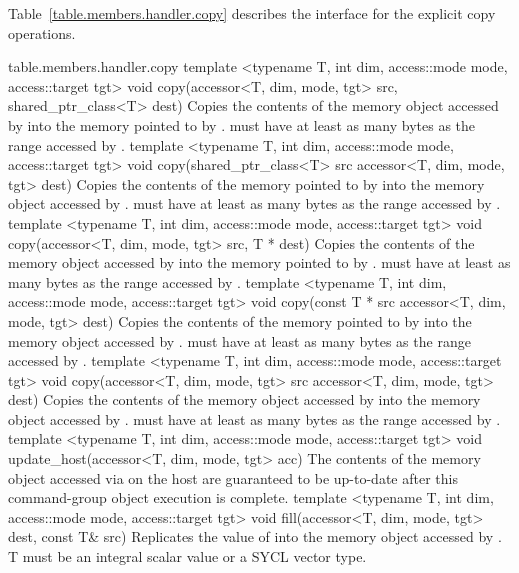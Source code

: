 Table~\ref{table.members.handler.copy} describes the interface for the
explicit copy operations.

{table.members.handler.copy}
  \addRowThreeL
    {template <typename T, int dim, access::mode mode, access::target tgt>}
    {void copy(accessor<T, dim, mode, tgt> src,}
    { shared_ptr_class<T> dest)}
    { Copies the contents of the memory object accessed by
       into the memory pointed to by .
       must have at least as many bytes as the
      range accessed by .}
  \addRowThreeL
    {template <typename T, int dim, access::mode mode, access::target tgt>}
    {void copy(shared_ptr_class<T> src}
    { accessor<T, dim, mode, tgt> dest)}
    { Copies the contents of the memory pointed to by 
      into the memory object accessed by .
       must have at least as many bytes as the
      range accessed by .}
  \addRowThreeL
    {template <typename T, int dim, access::mode mode, access::target tgt>}
    {void copy(accessor<T, dim, mode, tgt> src,}
    { T * dest)}
    { Copies the contents of the memory object accessed by
       into the memory pointed to by .
       must have at least as many bytes as the
      range accessed by .}
  \addRowThreeL
    {template <typename T, int dim, access::mode mode, access::target tgt>}
    {void copy(const T * src}
    { accessor<T, dim, mode, tgt> dest)}
    { Copies the contents of the memory pointed to by 
      into the memory object accessed by .
       must have at least as many bytes as the
      range accessed by .}
  \addRowThreeL
    {template <typename T, int dim, access::mode mode, access::target tgt>}
    {void copy(accessor<T, dim, mode, tgt> src}
    { accessor<T, dim, mode, tgt> dest)}
    { Copies the contents of the memory object accessed by 
      into the memory object accessed by .
       must have at least as many bytes as the
      range accessed by .}
  \addRowTwoL
    {template <typename T, int dim, access::mode mode, access::target tgt>}
    {void update_host(accessor<T, dim, mode, tgt> acc)}
    { The contents of the memory object accessed via 
      on the host are guaranteed to be up-to-date after this
      \gls{command-group} object execution is complete.}
  \addRowThreeL
    {template <typename T, int dim, access::mode mode, access::target tgt>}
    {void fill(accessor<T, dim, mode, tgt> dest,}
    {          const T\& src)}
    {Replicates the value of  into the
      memory object accessed by .
      T must be an integral scalar value or a SYCL vector type.
    }

